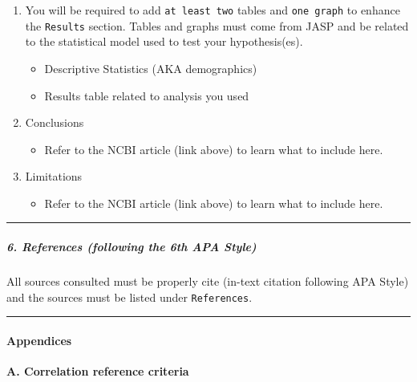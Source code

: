 \documentclass[11pt,]{article}
\providecommand{\tightlist}{%
  \setlength{\itemsep}{0pt}\setlength{\parskip}{0pt}}
\begin{document}
\begin{enumerate}
\def\labelenumi{\alph{enumi}.}
\item
  You will be required to add \texttt{at\ least\ two} tables and
  \texttt{one\ graph} to enhance the \texttt{Results} section. Tables
  and graphs must come from JASP and be related to the statistical model
  used to test your hypothesis(es).

  \begin{itemize}
  \item
    Descriptive Statistics (AKA demographics)
  \item
    Results table related to analysis you used
  \end{itemize}
\item
  Conclusions

  \begin{itemize}
  \tightlist
  \item
    Refer to the NCBI article (link above) to learn what to include
    here.
  \end{itemize}
\item
  Limitations

  \begin{itemize}
  \tightlist
  \item
    Refer to the NCBI article (link above) to learn what to include
    here.
  \end{itemize}
\end{enumerate}

\begin{center}\rule{0.5\linewidth}{0.5pt}\end{center}

\hypertarget{references-following-the-6th-apa-style}{%
\subparagraph{6. References (following the 6th APA
Style)}\label{references-following-the-6th-apa-style}}

All sources consulted must be properly cite (in-text citation following
APA Style) and the sources must be listed under \texttt{References}.

\begin{center}\rule{0.5\linewidth}{0.5pt}\end{center}

\hypertarget{appendices}{%
\paragraph{Appendices}\label{appendices}}

\textbf{A. Correlation reference criteria}
\end{document}
